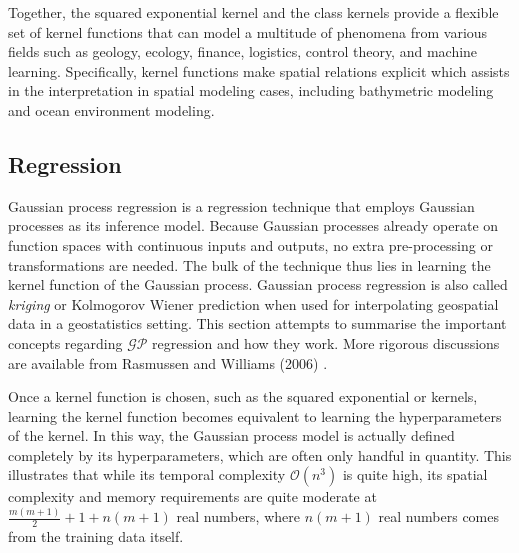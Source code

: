 			Together, the squared exponential kernel and the \matern class kernels provide a flexible set of kernel functions that can model a multitude of phenomena from various fields such as geology, ecology, finance, logistics, control theory, and machine learning. Specifically, kernel functions make spatial relations explicit which assists in the interpretation in spatial modeling cases, including bathymetric modeling and ocean environment modeling.
			
		\subsection{Regression}
		\label{Background:GaussianProcesses:Regression}
		
			Gaussian process regression is a regression technique that employs Gaussian processes as its inference model. Because Gaussian processes already operate on function spaces with continuous inputs and outputs, no extra pre-processing or transformations are needed. The bulk of the technique thus lies in learning the kernel function of the Gaussian process. Gaussian process regression is also called \textit{kriging} or Kolmogorov Wiener prediction when used for interpolating geospatial data in a geostatistics setting. This section attempts to summarise the important concepts regarding $\mathcal{GP}$ regression and how they work. More rigorous discussions are available from Rasmussen and Williams (2006) \cite{GaussianProcessForMachineLearning}. 
			
			Once a kernel function is chosen, such as the squared exponential or \matern kernels, learning the kernel function becomes equivalent to learning the hyperparameters of the kernel. In this way, the Gaussian process model is actually defined completely by its hyperparameters, which are often only handful in quantity. This illustrates that while its temporal complexity $\mathcal{O}(n^{3})$ is quite high, its spatial complexity and memory requirements are quite moderate at $\frac{m(m + 1)}{2} + 1 + n(m  + 1)$ real numbers, where $n(m  + 1)$ real numbers comes from the training data itself. %
			
